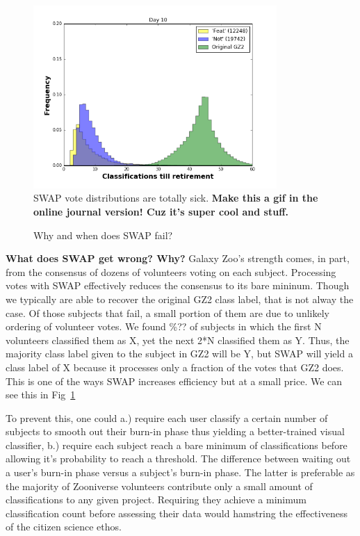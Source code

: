 \documentclass[twocolumn]{aastex6}
\begin{document}
\begin{figure}[t!]
\includegraphics[width=3.65in]{figures/clicks_till_retirement_GZ2_sup_PLPD5_p5_flipfeature2b_10.png}
\caption{SWAP vote distributions are totally sick. \textbf{Make this a gif in the online journal version! Cuz it's super cool and stuff. }\label{fig: swap vote distributions}}
\end{figure}

\begin{figure}[t!]
\caption{Why and when does SWAP fail?  \label{fig: SWAP sucks}}
\end{figure}

\textbf{What does SWAP get wrong? Why? }
Galaxy Zoo's strength comes, in part, from
the consensus of dozens of volunteers voting on each subject. Processing votes
with SWAP effectively reduces the consensus to its bare mininum. Though we typically
are able to recover the original GZ2 class label, that is not alway the case. Of those 
subjects that fail, a small portion of them are due to unlikely ordering of volunteer
votes. We found \%?? of subjects in which the first N volunteers classified them as X, 
yet the next 2*N classified them as Y. Thus, the majority class label given to the subject 
in GZ2 will be Y, but SWAP will yield a class label of X because it processes only a fraction
of the votes that GZ2 does. This is one of the ways SWAP increases efficiency but at a 
small price. We can see this in Fig~\ref{fig: swap vote distributions}


To prevent this, one could a.) require each user classify a certain number of subjects
to smooth out their burn-in phase thus yielding a better-trained visual classifier, 
b.) require each subject reach a bare minimum of classifications before allowing 
it's probability to reach a threshold. The difference between waiting out a user's burn-in 
phase versus a subject's burn-in phase.
The latter is preferable as the majority of Zooniverse volunteers contribute only 
a small amount of classifications to any given project. Requiring they achieve a 
minimum classification count before assessing their data would hamstring
the effectiveness of the citizen science ethos. 
\end{document}
